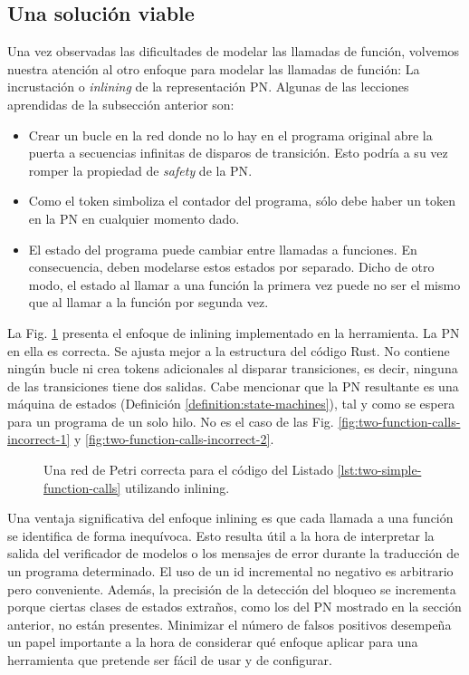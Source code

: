 \clearpage
\subsection{Una solución viable}

Una vez observadas las dificultades de modelar las llamadas de función, volvemos nuestra
atención al otro enfoque para modelar las llamadas de función:
La incrustación o \textit{inlining} de la representación \acrshort{PN}.
Algunas de las lecciones aprendidas de la subsección anterior son:

\begin{itemize}
    \item Crear un bucle en la red donde no lo hay en el programa original abre la puerta a
          secuencias infinitas de disparos de transición. Esto podría a su vez romper la
          propiedad de \emph{safety} de la \acrshort{PN}.
    \item Como el token simboliza el contador del programa,
          sólo debe haber un token en la \acrshort{PN} en cualquier momento dado.
    \item El estado del programa puede cambiar entre llamadas a funciones. En consecuencia,
          deben modelarse estos estados por separado. Dicho de otro modo, el estado al llamar a
          una función la primera vez puede no ser el mismo que al llamar a la función por segunda
          vez.
\end{itemize}

La Fig. \ref{fig:two-function-calls-correct} presenta el enfoque de inlining implementado en la herramienta.
La \acrshort{PN} en ella es correcta. Se ajusta mejor a la estructura del código Rust.
No contiene ningún bucle ni crea tokens adicionales al disparar transiciones,
es decir, ninguna de las transiciones tiene dos salidas.
Cabe mencionar que la \acrshort{PN} resultante es una máquina de estados (Definición \ref{definition:state-machines}),
tal y como se espera para un programa de un solo hilo.
No es el caso de las Fig. \ref{fig:two-function-calls-incorrect-1} y \ref{fig:two-function-calls-incorrect-2}.

\begin{figure}[!htbp]
    \centering
    
    \caption{Una red de Petri correcta para el código del Listado \ref{lst:two-simple-function-calls} utilizando inlining.}
    \label{fig:two-function-calls-correct}
\end{figure}

Una ventaja significativa del enfoque inlining es que cada llamada a una función se identifica
de forma inequívoca. Esto resulta útil a la hora de interpretar la salida del verificador de
modelos o los mensajes de error durante la traducción de un programa determinado. El uso de
un id incremental no negativo es arbitrario pero conveniente. Además, la precisión de la
detección del bloqueo se incrementa porque ciertas clases de estados extraños, como los del \acrshort{PN}
mostrado en la sección anterior, no están presentes. Minimizar el número de falsos positivos
desempeña un papel importante a la hora de considerar qué enfoque aplicar para una
herramienta que pretende ser fácil de usar y de configurar.

